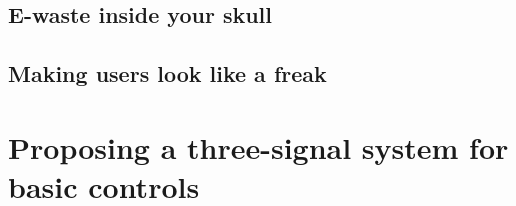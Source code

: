 \lipsum[1-4]


\subsection{E-waste inside your skull}
\label{subsec:bci_ethical_e_waste}


\lipsum[1-4]


\subsection{Making users look like a freak}
\label{subsec:bci_ethical_freaky}

\lipsum[1-2]


\section{Proposing a three-signal system for basic controls}
\label{sec:bci_small_projects_ours}

\lipsum[1-3]